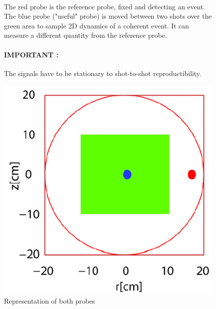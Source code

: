 \begin{figure}[h]
    \begin{minipage}{0.5\textwidth}
        \paragraph{}
        The red probe is the reference probe, fixed and detecting an event. The blue probe ("useful" probe) is moved between two shots over the green area to sample 2D dynamics of a coherent event. It can measure a different quantity from the reference probe.

        \paragraph{IMPORTANT :} 
        The signals have to be stationary to shot-to-shot reproductibility. 
    \end{minipage}
    \begin{minipage}{0.5\textwidth}
        \centering
        \includegraphics[scale=0.4]{Figures Cours Traitement du Signal/2D 3D.png}
        \caption{Representation of both probes}
        \label{fig:2D/3D synamics}
    \end{minipage}
    
\end{figure}